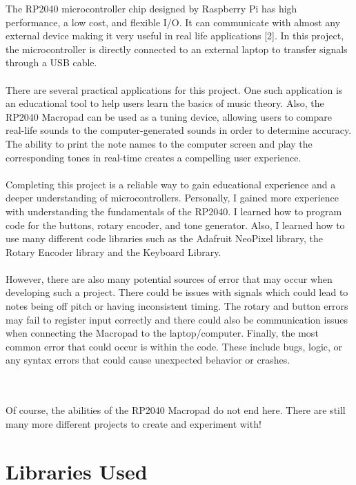 \documentclass{article}
\begin{document}
The RP2040 microcontroller chip designed by Raspberry Pi has high performance, a low cost, and flexible I/O. It can communicate with almost any external device making it very useful in real life applications [2]. In this project, the microcontroller is directly connected to an external laptop to transfer signals through a USB cable. \\\\

There are several practical applications for this project. One such application is an educational tool to help users learn the basics of music theory. Also, the RP2040 Macropad can be used as a tuning device, allowing users to compare real-life sounds to the computer-generated sounds in order to determine accuracy. The ability to print the note names to the computer screen and play the corresponding tones in real-time creates a compelling user experience. \\\\

Completing this project is a reliable way to gain educational experience and a deeper understanding of microcontrollers. Personally, I gained more experience with understanding the fundamentals of the RP2040. I learned how to program code for the buttons, rotary encoder, and tone generator. Also, I learned how to use many different code libraries such as the Adafruit NeoPixel library, the Rotary Encoder library and the Keyboard Library.\\\\

However, there are also many potential sources of error that may occur when developing such a project. There could be issues with signals which could lead to notes being off pitch or having inconsistent timing. The rotary and button errors may fail to register input correctly and there could also be communication issues when connecting the Macropad to the laptop/computer. Finally, the most common error that could occur is within the code. These include bugs, logic, or any syntax errors that could cause unexpected behavior or crashes. \\\\\

Of course, the abilities of the RP2040 Macropad do not end here. There are still many more different projects to create and experiment with!

\section{Libraries Used}
\end{document}

